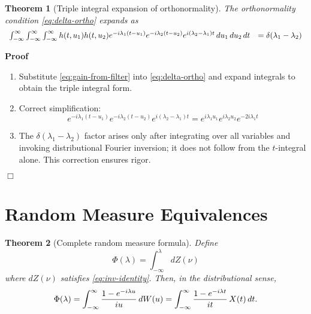 \documentclass{article}
\newenvironment{proof}{\noindent\textbf{Proof\ }}{\hspace*{\fill}$\Box$\medskip}
\newtheorem{theorem}{Theorem}
\begin{document}
\begin{theorem}
  [Triple integral expansion of orthonormality] The orthonormality condition
  \eqref{eq:delta-ortho} expands as
  \begin{equation}
    \begin{array}{ll}
      \int_{- \infty}^{\infty} \int_{- \infty}^{\infty} \int_{-
      \infty}^{\infty} h (t, u_1) h (t, u_2) e^{- i \lambda_1  (t - u_1)} e^{-
      i \lambda_2  (t - u_2)} e^{i (\lambda_2 - \lambda_1) t}  \hspace{0.17em}
      du_1  \hspace{0.17em} du_2  \hspace{0.17em} dt & = \delta (\lambda_1 -
      \lambda_2)
    \end{array} \label{eq:triple-integral}
  \end{equation}
\end{theorem}

\begin{proof}
  \begin{enumerate}
    \item Substitute \eqref{eq:gain-from-filter} into \eqref{eq:delta-ortho}
    and expand integrals to obtain the triple integral form.
    
    \item Correct simplification:
    \begin{equation}
      e^{- i \lambda_1  (t - u_1)} e^{- i \lambda_2  (t - u_2)} e^{i
      (\lambda_2 - \lambda_1) t} = e^{i \lambda_1 u_1} e^{i \lambda_2 u_2}
      e^{- 2 i \lambda_1 t}
    \end{equation}
    \item The $\delta (\lambda_1 - \lambda_2)$ factor arises only after
    integrating over all variables and invoking distributional Fourier
    inversion; it does not follow from the $t$-integral alone. This correction
    ensures rigor.
  \end{enumerate}
\end{proof}

\section{Random Measure Equivalences}

\begin{theorem}
  [Complete random measure formula] Define
  \begin{equation}
    \Phi (\lambda) = \int_{- \infty}^{\lambda} dZ (\nu)
  \end{equation}
  where $dZ (\nu)$ satisfies \eqref{eq:inv-identity}. Then, in the
  distributional sense,
  \begin{equation}
    \label{eq:phi-complete} \Phi (\lambda) = \int_{- \infty}^{\infty} \frac{1
    - e^{- i \lambda u}}{iu}  \hspace{0.17em} dW (u) = \int_{-
    \infty}^{\infty} \frac{1 - e^{- i \lambda t}}{it}  \hspace{0.17em} X (t) 
    \hspace{0.17em} dt.
  \end{equation}
\end{theorem}
\end{document}
